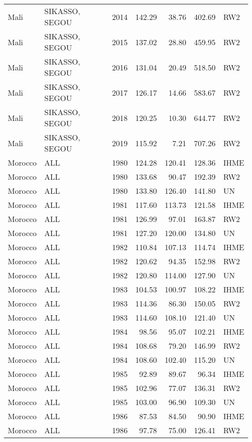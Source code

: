 \begin{longtable}{lllrrrl}
  Mali & SIKASSO, SEGOU & 2014 & 142.29 & 38.76 & 402.69 & RW2 \\ 
  Mali & SIKASSO, SEGOU & 2015 & 137.02 & 28.80 & 459.95 & RW2 \\ 
  Mali & SIKASSO, SEGOU & 2016 & 131.04 & 20.49 & 518.50 & RW2 \\ 
  Mali & SIKASSO, SEGOU & 2017 & 126.17 & 14.66 & 583.67 & RW2 \\ 
  Mali & SIKASSO, SEGOU & 2018 & 120.25 & 10.30 & 644.77 & RW2 \\ 
  Mali & SIKASSO, SEGOU & 2019 & 115.92 & 7.21 & 707.26 & RW2 \\ 
  Morocco & ALL & 1980 & 124.28 & 120.41 & 128.36 & IHME \\ 
  Morocco & ALL & 1980 & 133.68 & 90.47 & 192.39 & RW2 \\ 
  Morocco & ALL & 1980 & 133.80 & 126.40 & 141.80 & UN \\ 
  Morocco & ALL & 1981 & 117.60 & 113.73 & 121.58 & IHME \\ 
  Morocco & ALL & 1981 & 126.99 & 97.01 & 163.87 & RW2 \\ 
  Morocco & ALL & 1981 & 127.20 & 120.00 & 134.80 & UN \\ 
  Morocco & ALL & 1982 & 110.84 & 107.13 & 114.74 & IHME \\ 
  Morocco & ALL & 1982 & 120.62 & 94.35 & 152.98 & RW2 \\ 
  Morocco & ALL & 1982 & 120.80 & 114.00 & 127.90 & UN \\ 
  Morocco & ALL & 1983 & 104.53 & 100.97 & 108.22 & IHME \\ 
  Morocco & ALL & 1983 & 114.36 & 86.30 & 150.05 & RW2 \\ 
  Morocco & ALL & 1983 & 114.60 & 108.10 & 121.40 & UN \\ 
  Morocco & ALL & 1984 & 98.56 & 95.07 & 102.21 & IHME \\ 
  Morocco & ALL & 1984 & 108.68 & 79.20 & 146.99 & RW2 \\ 
  Morocco & ALL & 1984 & 108.60 & 102.40 & 115.20 & UN \\ 
  Morocco & ALL & 1985 & 92.89 & 89.67 & 96.34 & IHME \\ 
  Morocco & ALL & 1985 & 102.96 & 77.07 & 136.31 & RW2 \\ 
  Morocco & ALL & 1985 & 103.00 & 96.90 & 109.30 & UN \\ 
  Morocco & ALL & 1986 & 87.53 & 84.50 & 90.90 & IHME \\ 
  Morocco & ALL & 1986 & 97.78 & 75.00 & 126.41 & RW2 \\ 

\end{longtable}
